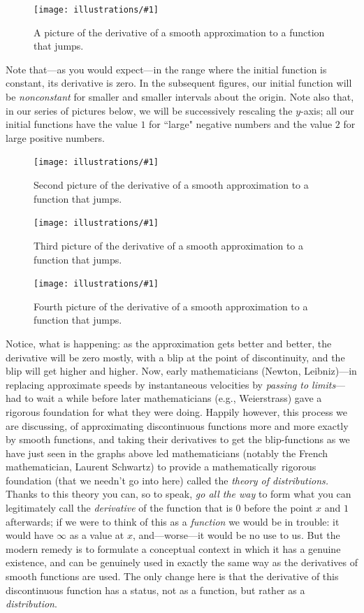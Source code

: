 \documentclass[11pt,draft]{article}
\newcommand{\ill}[3]{ 
   \begin{figure}[H]
   \begin{center}
   \texttt{[image: illustrations/\#1]}
   \caption{#3}
   \end{center}
    \end{figure}
}
\theoremstyle{plain}
\theoremstyle{definition}
\numberwithin{equation}{section}
\numberwithin{figure}{section}
\numberwithin{table}{section}
\begin{document}
\ill{jump-smooth-deriv-point700000000000000}{0.6}{A picture of the derivative of
a smooth approximation to a function that jumps.}

Note that---as you would expect---in the range where the initial
function is constant, its derivative is zero. In the subsequent
figures, our initial function will be {\it nonconstant} for smaller
and smaller intervals about the origin. Note also that, in our series
of pictures below, we will be successively rescaling the $y$-axis; all
our initial functions have the value $1$ for ``large" negative numbers
and the value $2$ for large positive numbers.

\ill{jump-smooth-deriv-point200000000000000}{0.5}{Second picture of the derivative of
a smooth approximation to a function that jumps.}
\ill{jump-smooth-deriv-point0500000000000000}{0.5}{Third picture of the derivative of
a smooth approximation to a function that jumps.}
\ill{jump-smooth-deriv-point0100000000000000}{0.5}{Fourth picture of the derivative of
a smooth approximation to a function that jumps.}


Notice, what is happening: as the approximation gets better and
better, the derivative will be zero mostly, with a blip at the point
of discontinuity, and the blip will get higher and higher.  Now, early
mathematicians (Newton, Leibniz)---in replacing approximate speeds by
instantaneous velocities by {\em passing to limits}---had to wait a
while before later mathematicians (e.g., Weierstrass) gave a rigorous
foundation for what they were doing.  Happily however, this process we
are discussing, of approximating discontinuous functions more and more
exactly by smooth functions, and taking their derivatives to get the
blip-functions as we have just seen in the graphs above led
mathematicians (notably the French mathematician, Laurent Schwartz) to
provide a mathematically rigorous foundation (that we needn't go into
here) called the {\em theory of distributions.} Thanks to this theory
you can, so to speak, {\em go all the way} to form what you can
legitimately call the {\em derivative} of the function that is $0$
before the point $x$ and $1$ afterwards; if we were to think of this
as a {\em function} we would be in trouble: it would have $\infty$ as
a value at $x$, and---worse---it would be no use to us. But the modern
remedy is to formulate a conceptual context in which it has a genuine
existence, and can be genuinely used in exactly the same way as the
derivatives of smooth functions are used. The only change here is that
the derivative of this discontinuous function has a status, not as a
function, but rather as a {\em distribution}.  
\end{document}
